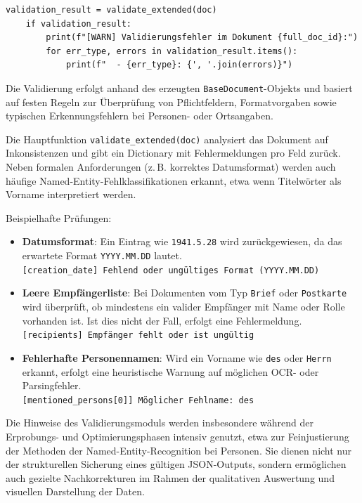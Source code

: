 \documentclass[12pt, a4paper, ngerman, bidi=default]{article}
\newcommand{\code}[1]{\colorbox{VeryLightGray}{\texttt{#1}}} %
\begin{document}
\begin{verbatim}
validation_result = validate_extended(doc)
    if validation_result:
        print(f"[WARN] Validierungsfehler im Dokument {full_doc_id}:")
        for err_type, errors in validation_result.items():
            print(f"  - {err_type}: {', '.join(errors)}")

\end{verbatim}

Die Validierung erfolgt anhand des erzeugten \code{BaseDocument}-Objekts und basiert auf festen Regeln zur Überprüfung von Pflichtfeldern, Formatvorgaben sowie typischen Erkennungsfehlern bei Personen- oder Ortsangaben.

Die Hauptfunktion \code{validate\_extended(doc)} analysiert das Dokument auf Inkonsistenzen und gibt ein Dictionary mit Fehlermeldungen pro Feld zurück. Neben formalen Anforderungen (z.\,B. korrektes Datumsformat) werden auch häufige Named-Entity-Fehlklassifikationen erkannt, etwa wenn Titelwörter als Vorname interpretiert werden.

Beispielhafte Prüfungen:

\begin{itemize}
    \item \textbf{Datumsformat}: Ein Eintrag wie \texttt{1941.5.28} wird zurückgewiesen, da das erwartete Format \texttt{YYYY.MM.DD} lautet.\\
    \texttt{[creation\_date] Fehlend oder ungültiges Format (YYYY.MM.DD)}

    \item \textbf{Leere Empfängerliste}: Bei Dokumenten vom Typ \texttt{Brief} oder \texttt{Postkarte} wird überprüft, ob mindestens ein valider Empfänger mit Name oder Rolle vorhanden ist. Ist dies nicht der Fall, erfolgt eine Fehlermeldung.\\
    \texttt{[recipients] Empfänger fehlt oder ist ungültig}

    \item \textbf{Fehlerhafte Personennamen}: Wird ein Vorname wie \texttt{des} oder \texttt{Herrn} erkannt, erfolgt eine heuristische Warnung auf möglichen OCR- oder Parsingfehler.\\
    \texttt{[mentioned\_persons[0]] Möglicher Fehlname: des}
\end{itemize}

Die Hinweise des Validierungsmoduls werden insbesondere während der Erprobungs- und Optimierungsphasen intensiv genutzt, etwa zur Feinjustierung der Methoden der Named-Entity-Recognition bei Personen. Sie dienen nicht nur der strukturellen Sicherung eines gültigen JSON-Outputs, sondern ermöglichen auch gezielte Nachkorrekturen im Rahmen der qualitativen Auswertung und visuellen Darstellung der Daten.
\end{document}
